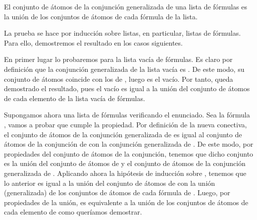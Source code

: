 \begin{isabellebody}
\begin{isamarkuptext}
  \begin{lema}
  El conjunto de átomos de la conjunción generalizada de una lista 
  de fórmulas es la unión de los conjuntos de átomos de cada fórmula de 
  la lista.
  \end{lema}

  \begin{demostracion}
  La prueba se hace por inducción sobre listas, en particular,
  listas de fórmulas. Para ello, demostremos el resultado en los casos
  siguientes. 

  En primer lugar lo probaremos para la lista vacía de fórmulas. Es
  claro por definición que la conjunción generalizada de la lista vacía
  es \isa{{\isasymnot}\ {\isasymbottom}}. De este modo, su conjunto de átomos coincide con los de 
  \isa{{\isasymbottom}}, luego es el vacío. Por tanto, queda demostrado el resultado, 
  pues el vacío es igual a la unión del conjunto de átomos de cada 
  elemento de la lista vacía de fórmulas. 

  Supongamos ahora una lista de fórmulas  verificando el enunciado.
  Sea la fórmula , vamos a probar que  cumple la propiedad.
  Por definición de la nueva conectiva, el conjunto de átomos de 
  la conjunción generalizada de  es igual al conjunto de átomos de 
  la conjunción de  con la conjunción generalizada de . De este
  modo, por propiedades del conjunto de átomos de la conjunción, tenemos
  que dicho conjunto es la unión del conjunto de átomos de  y el
  conjunto de átomos de la conjunción generalizada de . Aplicando 
  ahora la hipótesis de inducción sobre , tenemos que lo anterior es 
  igual a la unión del conjunto de átomos de  con la unión
 (generalizada) de los conjuntos de átomos de cada fórmula de . 
  Luego, por propiedades de la unión, es equivalente a la unión de los 
  conjuntos de átomos de cada elemento de  como queríamos 
  demostrar.
  \end{demostracion}


\end{isamarkuptext}
\end{isabellebody}
